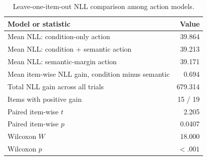 \begin{table}[htbp]
\centering
\caption{Leave-one-item-out NLL comparison among action models.}
\label{tab:item-nll}
\begin{tabular}{l r}
\toprule
Model or statistic & Value \\
\midrule
Mean NLL: condition-only action & 39.864 \\
Mean NLL: condition + semantic action & 39.213 \\
Mean NLL: semantic-margin action & 39.171 \\
Mean item-wise NLL gain, condition minus semantic & 0.694 \\
Total NLL gain across all trials & 679.314 \\
Items with positive gain & 15 / 19 \\
Paired item-wise $t$ & 2.205 \\
Paired item-wise $p$ & 0.0407 \\
Wilcoxon $W$ & 18.000 \\
Wilcoxon $p$ & $<.001$ \\
\bottomrule
\end{tabular}
\end{table}
